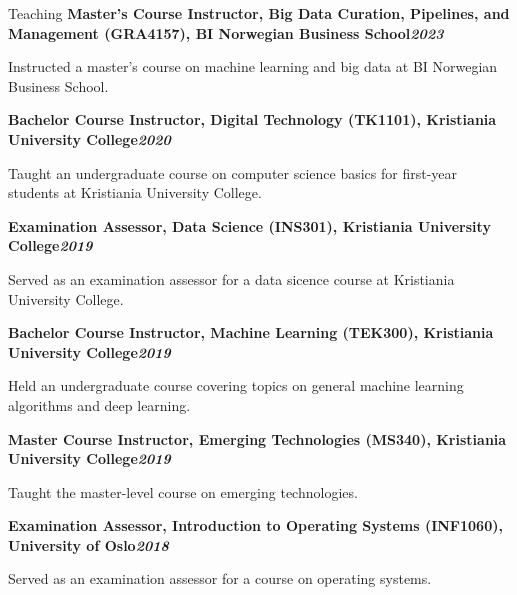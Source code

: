 \begin{rubric}{Teaching}
\entry*[]%
\textbf{Master's Course Instructor, Big Data Curation, Pipelines, and Management (GRA4157), BI Norwegian Business School\hfill\textit{2023}} \par
\begin{compactitem}
    \item Instructed a master's course on machine learning and big data at BI Norwegian Business School.
    \vspace{-12pt}
\end{compactitem}
%
\entry*[]%
\textbf{Bachelor Course Instructor, Digital Technology (TK1101), Kristiania University College\hfill\textit{2020}} \par
\begin{compactitem}
    \item Taught an undergraduate course on computer science basics for first-year students at Kristiania University College.
    \vspace{-12pt}
\end{compactitem}
%
\entry*[]%
\textbf{Examination Assessor, Data Science (INS301), Kristiania University College\hfill\textit{2019}} \par
\begin{compactitem}
    \item Served as an examination assessor for a data sicence course at Kristiania University College.
    \vspace{-12pt}
\end{compactitem}
%
\entry*[]%
\textbf{Bachelor Course Instructor, Machine Learning (TEK300), Kristiania University College\hfill\textit{2019}} \par
\begin{compactitem}
    \item Held an undergraduate course covering topics on general machine learning algorithms and deep learning.
    \vspace{-12pt}
\end{compactitem}
%
\entry*[]%
\textbf{Master Course Instructor, Emerging Technologies (MS340), Kristiania University College\hfill\textit{2019}} \par
\begin{compactitem}
    \item Taught the master-level course on emerging technologies.
    \vspace{-12pt}
\end{compactitem}
%
\entry*[]%
\textbf{Examination Assessor, Introduction to Operating Systems (INF1060), University of Oslo\hfill\textit{2018}} \par
\begin{compactitem}
    \item Served as an examination assessor for a course on operating systems.
    \vspace{-12pt}
\end{compactitem}
\end{rubric}